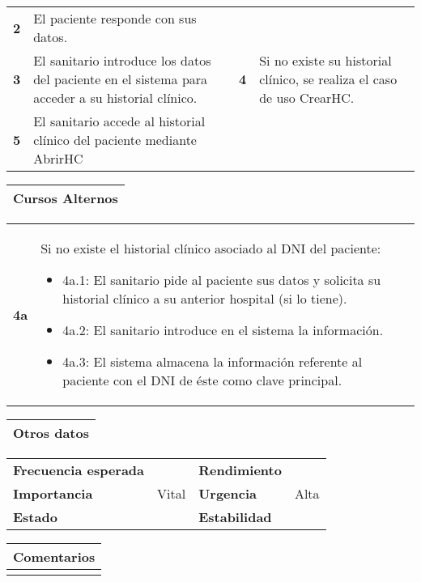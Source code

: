 \documentclass[11pt,a4paper]{article}
\begin{document}
\begin{table}[H]
\begin{tabularx}{\textwidth}{cXcX}
		\textbf{2} & El paciente responde con sus datos.         & & \\
		
		\textbf{3} & El sanitario introduce los datos del paciente en el sistema para acceder a su historial clínico. & \textbf{4} & Si no existe su historial clínico, se realiza el caso de uso CrearHC. \\
		
		\textbf{5} & El sanitario accede al historial clínico del paciente mediante AbrirHC & & \\
	\end{tabularx}
	
	\begin{tabularx}{\textwidth}{X}
		\textbf{Cursos Alternos}\\ \hline
	\end{tabularx}
	\begin{tabularx}{\textwidth}{cX}
		\textbf{4a} & Si no existe el historial clínico asociado al DNI del paciente:
		\small
		\begin{itemize}
			\item 4a.1: El sanitario pide al paciente sus datos y solicita su historial clínico a su anterior hospital (si lo tiene).
			\item 4a.2: El sanitario introduce en el sistema la información.
			\item 4a.3: El sistema almacena la información referente al paciente con el DNI de éste como clave principal.
		\end{itemize}\\
	\end{tabularx}
\end{table}

\begin{table}[H]
	\begin{tabularx}{\textwidth}{X}
		\textbf{Otros datos}\\ \hline
	\end{tabularx}
	\begin{tabularx}{\textwidth}{lXlX}
		\textbf{Frecuencia esperada} &  & \textbf{Rendimiento} & \\
		\textbf{Importancia} & Vital & \textbf{Urgencia} & Alta\\
		\textbf{Estado} &  & \textbf{Estabilidad} & \\
	\end{tabularx}
	
	\bigskip
	
	\begin{tabularx}{\textwidth}{X}
		\textbf{Comentarios}\\ \hline
		[...] \\
	\end{tabularx}
\end{table}
\end{document}
